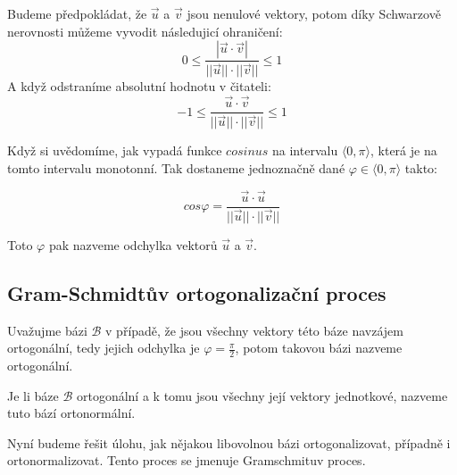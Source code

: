 Budeme předpokládat, že $\vec{u}$ a $\vec{v}$ jsou nenulové
vektory, potom díky Schwarzově nerovnosti můžeme vyvodit
následujicí ohraničení:
$$0 \leq \frac{|\vec{u} \cdot \vec{v}|}
{||\vec{u}|| \cdot||\vec{v}||} \leq 1$$
A když odstraníme absolutní hodnotu v čitateli:
$$-1 \leq \frac{\vec{u} \cdot \vec{v}}
{||\vec{u}|| \cdot||\vec{v}||} \leq 1$$

Když si uvědomíme, jak vypadá funkce $cosinus$ na
intervalu $\langle0, \pi \rangle$, která je na tomto
intervalu monotonní. Tak dostaneme jednoznačně dané $\varphi \in \langle 0,
\pi \rangle$ takto:

$$cos \varphi = \frac{\vec{u} \cdot
\vec{u}}{||\vec{u}|| \cdot ||\vec{v}||}$$

Toto $\varphi$ pak nazveme odchylka vektorů $\vec{u}$ a $\vec{v}$.

\subsection{Gram-Schmidtův ortogonalizační proces}

\begin{definition}
    Uvažujme bázi $\mathcal{B}$ v případě, že jsou všechny vektory této
    báze navzájem ortogonální, tedy jejich odchylka je $\varphi = \frac{\pi}{2}$,
    potom takovou bázi nazveme ortogonální.
\end{definition}

\begin{definition}
    Je li báze $\mathcal{B}$ ortogonální a k tomu jsou všechny
    její vektory jednotkové, nazveme tuto bází ortonormální.
\end{definition}

Nyní budeme řešit úlohu, jak nějakou libovolnou bázi ortogonalizovat,
případně i ortonormalizovat. Tento proces se jmenuje Gramschmituv proces.

